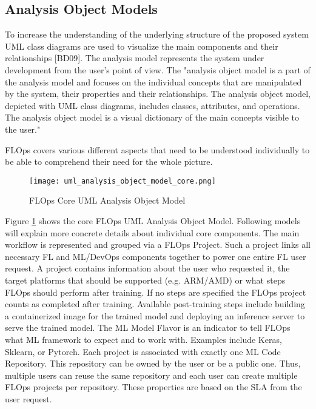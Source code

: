 \subsection{Analysis Object Models}
To increase the understanding of the underlying structure of the proposed
system UML class diagrams are used to visualize the main components and
their relationships [BD09].
The analysis model represents the system under development from the user’s point of view. The
"analysis object model is a part of the analysis model and focuses on the individual concepts that
are manipulated by the system, their properties and their relationships. The analysis object
model, depicted with UML class diagrams, includes classes, attributes, and operations. The
analysis object model is a visual dictionary of the main concepts visible to the user."

FLOps covers various different aspects that need to be understood individually to be able to comprehend their need for the whole picture.



\begin{figure}[h]
    \centering
    \texttt{[image: uml\_analysis\_object\_model\_core.png]}
    \caption{FLOps Core UML Analysis Object Model}
    \label{fig:uml_core_analysis_object_model}
\end{figure}

Figure \ref{fig:uml_core_analysis_object_model} shows the core FLOps UML Analysis Object Model.
Following models will explain more concrete details about individual core components. 
The main workflow is represented and grouped via a FLOps Project.
Such a project links all necessary FL and ML/DevOps components together to power one entire FL user request.
A project contains information about the user who requested it, the target platforms that should be supported (e.g. ARM/AMD) or what steps FLOps should perform after training.
If no steps are specified the FLOps project counts as completed after training.
Available post-training steps include building a containerized image for the trained model 
and deploying an inference server to serve the trained model.
The ML Model Flavor is an indicator to tell FLOps what ML framework to expect and to work with.
Examples include Keras, Sklearn, or Pytorch.
Each project is associated with exactly one ML Code Repository.
This repository can be owned by the user or be a public one.
Thus, multiple users can reuse the same repository and each user can create multiple FLOps projects per repository.
These properties are based on the SLA from the user request. 

